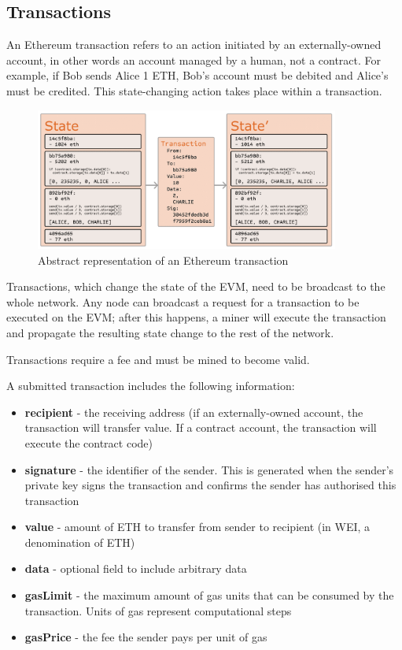 \subsection{Transactions}
An Ethereum transaction refers to an action initiated by an externally-owned account, in other words an account managed by a human, not a contract. For example, if Bob sends Alice 1 ETH, Bob's account must be debited and Alice's must be credited. This state-changing action takes place within a transaction.

\begin{figure}[H]
	\centering
		\includegraphics[width=10cm]{images/chapter2/transition.png}
		\caption{{\footnotesize Abstract representation of an Ethereum transaction}}
\end{figure}

Transactions, which change the state of the EVM, need to be broadcast to the whole network. Any node can broadcast a request for a transaction to be executed on the EVM; after this happens, a miner will execute the transaction and propagate the resulting state change to the rest of the network.

Transactions require a fee and must be mined to become valid.

A submitted transaction includes the following information:

\begin{itemize}
\item \textbf{recipient} - the receiving address (if an externally-owned account, the transaction will transfer value. If a contract account, the transaction will execute the contract code)
\item \textbf{signature} - the identifier of the sender. This is generated when the sender's private key signs the transaction and confirms the sender has authorised this transaction
\item \textbf{value} - amount of ETH to transfer from sender to recipient (in WEI, a denomination of ETH)
\item \textbf{data} - optional field to include arbitrary data
\item \textbf{gasLimit} - the maximum amount of gas units that can be consumed by the transaction. Units of gas represent computational steps
\item \textbf{gasPrice} - the fee the sender pays per unit of gas
\end{itemize}

